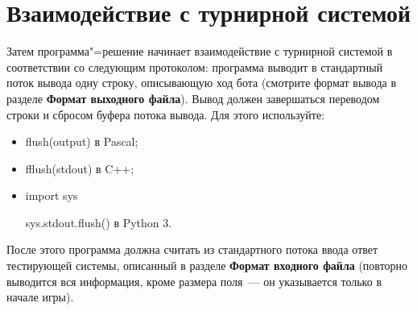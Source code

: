 \documentclass[a4paper,12pt]{article}
\begin{document}
\section{Взаимодействие с турнирной системой}
Затем программа"=решение начинает взаимодействие с турнирной системой в соответствии со следующим протоколом:
программа выводит в стандартный поток вывода одну строку, описывающую ход бота (смотрите формат вывода в разделе \textbf{Формат выходного файла}). Вывод должен завершаться переводом строки и сбросом буфера потока
вывода. Для этого используйте:
\begin{itemize}
\item flush(output) в Pascal;
\item fflush(stdout) в C++;
\item import sys
      
      sys.stdout.flush() в Python 3.
\end{itemize}
После этого программа должна считать из стандартного потока ввода ответ тестирующей системы, описанный в разделе \textbf{Формат входного файла} (повторно выводится вся информация, кроме размера поля~--- он указывается только в начале игры).
\end{document}
